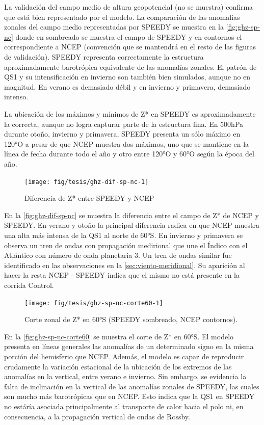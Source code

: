 \documentclass[spanish,a4paper,12pt,oneside]{book}
\begin{document}
La validación del campo medio de altura geopotencial (no se muestra)
confirma que está bien representado por el modelo. La comparación de las
anomalías zonales del campo medio representadas por SPEEDY se muestra en
la \autoref{fig:ghz-sp-nc} donde en sombreado se muestra el campo de
SPEEDY y en contornos el correspondiente a NCEP (convención que se
mantendrá en el resto de las figuras de validación). SPEEDY representa
correctamente la estructura aproximadamente barotrópica equivalente de
las anomalías zonales. El patrón de QS1 y su intensificación en invierno
son también bien simulados, aunque no en magnitud. En verano es
demasiado débil y en invierno y primavera, demasiado intenso.

La ubicación de los máximos y mínimos de Z* en SPEEDY es aproximadamente
la correcta, aunque no logra capturar parte de la estructura fina. En
500hPa durante otoño, invierno y primavera, SPEEDY presenta un sólo
máximo en 120°O a pesar de que NCEP muestra dos máximos, uno que se
mantiene en la línea de fecha durante todo el año y otro entre 120°O y
60°O según la época del año.

\begin{landscape}\begin{figure}

{\centering \texttt{[image: fig/tesis/ghz-dif-sp-nc-1]} 

}

\caption{Diferencia de Z* entre SPEEDY y NCEP}\label{fig:ghz-dif-sp-nc}
\end{figure}
\end{landscape}

En la \autoref{fig:ghz-dif-sp-nc} se muestra la diferencia entre el
campo de Z* de NCEP y SPEEDY. En verano y otoño la principal diferencia
radica en que NCEP muestra una alta más intensa de la QS1 al norte de
60°S. En invierno y primavera se observa un tren de ondas con
propagación medirional que une el Índico con el Atlántico con número de
onda planetaria 3. Un tren de ondas similar fue identificado en las
observaciones en la \autoref{sec:viento-meridional}. Su aparición al
hacer la resta NCEP - SPEEDY indica que el mismo no está presente en la
corrida Control.

\begin{figure}
\texttt{[image: fig/tesis/ghz-sp-nc-corte60-1]} \caption{Corte zonal de Z* en 60°S (SPEEDY sombreado, NCEP contornos).}\label{fig:ghz-sp-nc-corte60}
\end{figure}

En la \autoref{fig:ghz-sp-nc-corte60} se muestra el corte de Z* en 60°S.
El modelo presenta en líneas generales las anomalías de un determinado
signo en la misma porción del hemisferio que NCEP. Además, el modelo es
capaz de reproducir crudamente la variación estacional de la ubicación
de los extremos de las anomalías en la vertical, entre verano e
invierno. Sin embargo, se evidencia la falta de inclinación en la
vertical de las anomalías zonales de SPEEDY, las cuales son mucho más
barotrópicas que en NCEP. Esto indica que la QS1 en SPEEDY no estáría
asociada principalmente al transporte de calor hacia el polo ni, en
consecuencia, a la propagación vertical de ondas de Rossby.
\end{document}
